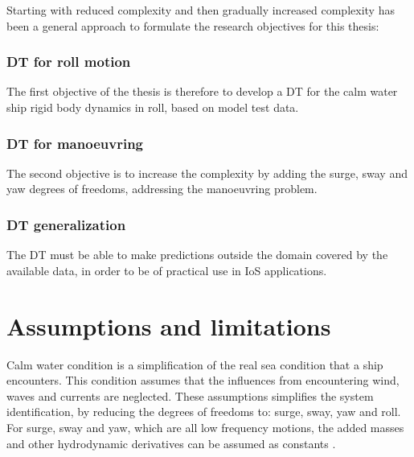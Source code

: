 \bigskip
\noindent Starting with reduced complexity and then gradually increased complexity has been a general approach to formulate the research objectives for this thesis:   


\subsubsection*{DT for roll motion}
The first objective of the thesis is therefore to develop a DT for the calm water ship rigid body dynamics in roll, based on model test data.

\subsubsection*{DT for manoeuvring}
The second objective is to increase the complexity by adding the surge, sway and yaw degrees of freedoms, addressing the manoeuvring problem.

\subsubsection*{DT generalization}
The DT must be able to make predictions outside the domain covered by the available data, in order to be of practical use in IoS applications.

\section{Assumptions and limitations}
Calm water condition is a simplification of the real sea condition that a ship encounters. This condition assumes that the influences from encountering wind, waves and currents are neglected. These assumptions simplifies the system identification, by reducing the degrees of freedoms to: surge, sway, yaw and roll. For surge, sway and yaw, which are all low frequency motions, the added masses and other hydrodynamic derivatives can be assumed as constants \cite{fossen_handbook_2021}.  

